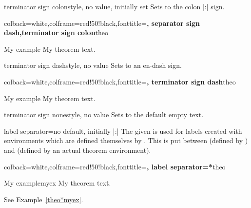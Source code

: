 \clearpage
\begin{docTcbKey}{terminator sign colon}{}{style, no value, initially set}
Sets  to the colon |:| sign.
\begin{dispExample}
%
  {colback=white,colframe=red!50!black,fonttitle=\bfseries,
   separator sign dash,terminator sign colon}{theo}
\begin{sometheorem}{My example}{}
My theorem text.
\end{sometheorem}
\end{dispExample}
\end{docTcbKey}

\begin{docTcbKey}{terminator sign dash}{}{style, no value}
Sets  to an en-dash sign.
\begin{dispExample}
%
  {colback=white,colframe=red!50!black,fonttitle=\bfseries,
   terminator sign dash}{theo}
\begin{sometheorem}{My example}{}
My theorem text.
\end{sometheorem}
\end{dispExample}
\end{docTcbKey}

\begin{docTcbKey}{terminator sign none}{}{style, no value}
Sets  to the default empty text.
\end{docTcbKey}


\begin{docTcbKey}[][doc new=2016-04-19]{label separator}{=}{no default, initially |:|}
  The given  is used for labels created with environments which
  are defined themselves by . This  is
  put between  (defined by )
  and  (defined by an actual theorem environment).
\begin{dispExample}
%
  {colback=white,colframe=red!50!black,fonttitle=\bfseries,
   label separator=*}{theo}
\begin{sometheorem}{My example}{myex}
My theorem text.
\end{sometheorem}
See Example~\ref{theo*myex}.
\end{dispExample}
\end{docTcbKey}


